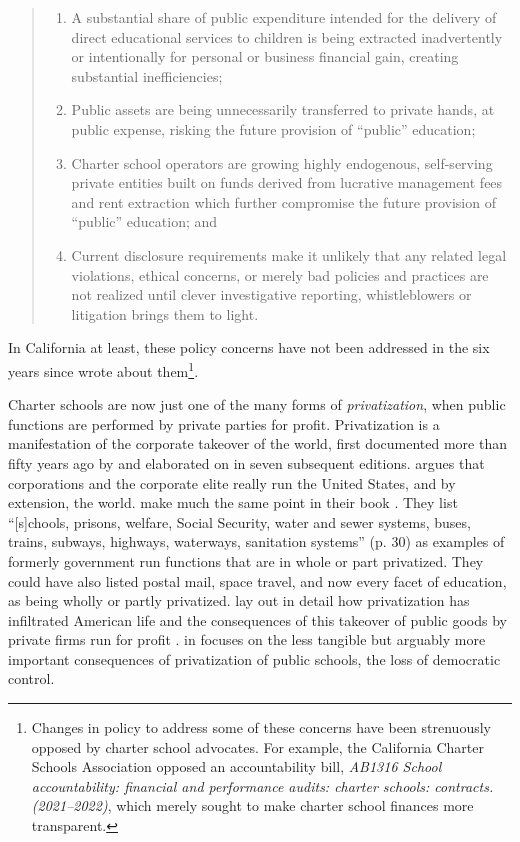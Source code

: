 \begin{quote}\OnehalfSpacing%
  \begin{enumerate}
    \item A substantial share of public expenditure intended for the delivery of direct educational services to children is being extracted inadvertently or intentionally for personal or business financial gain, creating substantial inefficiencies;
    \item Public assets are being unnecessarily transferred to private hands, at public expense, risking the future provision of “public” education;
    \item Charter school operators are growing highly endogenous, self-serving private entities built on funds derived from lucrative management fees and rent extraction which further compromise the future provision of “public” education; and
    \item Current disclosure requirements make it unlikely that any related legal violations, ethical concerns, or merely bad policies and practices are not realized until clever investigative reporting, whistleblowers or litigation brings them to light.
  \end{enumerate} 
\end{quote}

In California at least, these policy concerns have not been addressed in the six years since \citeauthor{Baker.Miron2015} wrote about them\footnote{Changes in policy to address some of these concerns have been strenuously opposed by charter school advocates. For example, the California Charter Schools Association opposed an accountability bill, \textit{AB1316 School accountability: financial and performance audits: charter schools: contracts. (2021–2022)}, which merely sought to make charter school finances more transparent.}.

Charter schools are now just one of the many forms of \textit{privatization}, when public functions are performed by private parties for profit. Privatization is a manifestation of the corporate takeover of the world, first documented more than fifty years ago by \citeauthor{Domhoff2014} and elaborated on in seven subsequent editions. \citeauthor{Domhoff2014} argues that corporations and the corporate elite really run the United States, and by extension, the world. \textcite{Kahn.Minnich2005} make much the same point in their book  \parencite{Kahn.Minnich2005}. They list ``[s]chools, prisons, welfare, Social Security, water and sewer systems, buses, trains, subways, highways, waterways, sanitation systems'' (p. 30) as examples of formerly government run functions that are in whole or part privatized. They could have also listed postal mail, space travel, and now every facet of education, as being wholly or partly privatized. \textcite{Cohen.Mikaelian2021} lay out in detail how privatization has infiltrated American life and the consequences of this takeover of public goods by private firms run for profit  \parencite{Cohen.Mikaelian2021}. \citeauthor{Black2020} in  \parencite{Black2020} focuses on the less tangible but arguably more important consequences of privatization of public schools, the loss of democratic control.

